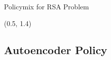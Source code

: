 \documentclass[english,aspectratio=169,dvipsnames]{beamer}
\begin{document}
%             

\begin{frame}{Policymix for RSA Problem}
	\begin{textblock}{5}(0.5, 1.4)
        
    \end{textblock}
\end{frame}


\subsection{Autoencoder Policy}
\end{document}
